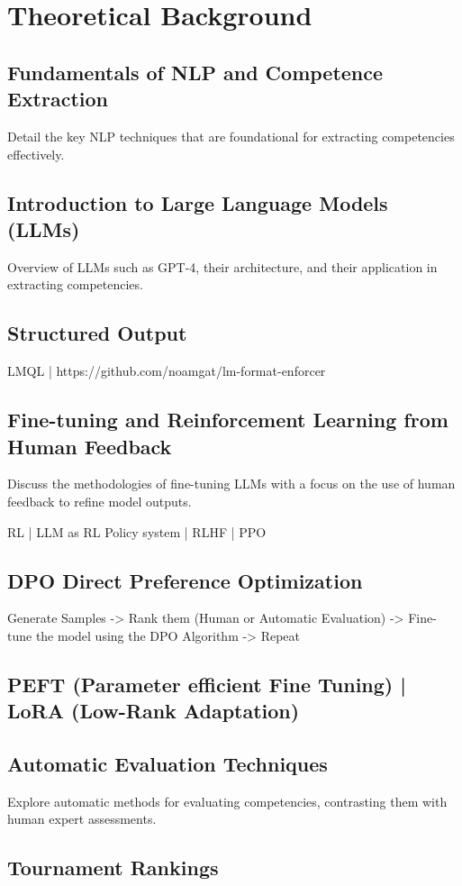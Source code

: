 \section{Theoretical Background}

\subsection{Fundamentals of NLP and Competence Extraction} Detail the key NLP techniques that are foundational for extracting competencies effectively.
\subsection{Introduction to Large Language Models (LLMs)} Overview of LLMs such as GPT-4, their architecture, and their application in extracting competencies.

\subsection{Structured Output}

LMQL | https://github.com/noamgat/lm-format-enforcer

\subsection{Fine-tuning and Reinforcement Learning from Human Feedback} Discuss the methodologies of fine-tuning LLMs with a focus on the use of human feedback to refine model outputs.

RL | LLM as RL Policy system | RLHF | PPO 

\subsection{DPO Direct Preference Optimization}

Generate Samples -> Rank them (Human or Automatic Evaluation) -> Fine-tune the model using the DPO Algorithm -> Repeat


\subsection{PEFT (Parameter efficient Fine Tuning) | LoRA (Low-Rank Adaptation)}


\subsection{Automatic Evaluation Techniques} Explore automatic methods for evaluating competencies, contrasting them with human expert assessments.
\subsection{Tournament Rankings}
